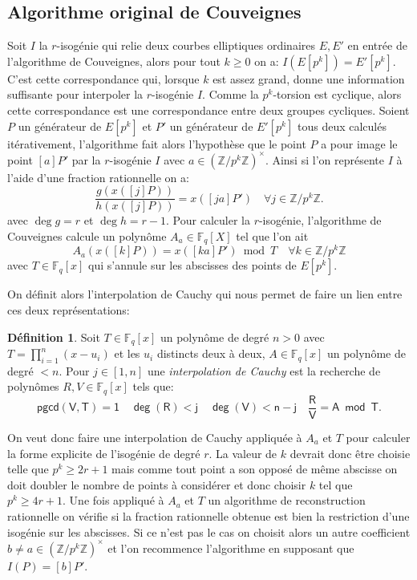 \documentclass[10pt,a4paper]{book}
\theoremstyle{plain}
\theoremstyle{definition}
\theoremstyle{definition}
\theoremstyle{definition}
\theoremstyle{definition}
\theoremstyle{definition}
\newtheorem{defi}[thm]{Définition}
\theoremstyle{remark}
\theoremstyle{remark}
\theoremstyle{definition}
\begin{document}
\subsection{Algorithme original de Couveignes}
\label{sub:ori:cou}
Soit $I$ la $r$-isogénie qui relie deux courbes elliptiques ordinaires 
$E,E'$ en entrée de l'algorithme de Couveignes, alors pour tout $k \geqslant 0$
on a: $I(E[p^k])=E'[p^k]$. C'est cette correspondance qui, lorsque $k$ est 
assez grand, donne une information suffisante pour interpoler la $r$-isogénie 
$I$. Comme la $p^k$-torsion est cyclique, alors cette correspondance est une 
correspondance entre deux groupes cycliques. Soient $P$ un générateur de 
$E[p^k]$ et $P'$ un générateur de $E'[p^k]$ tous deux calculés itérativement, 
l'algorithme fait alors l'hypothèse que le point $P$ a pour image le point 
$[a]P'$ par la $r$-isogénie $I$ avec $a \in (\mathbb{Z}/p^k\mathbb{Z})^{\times}$. Ainsi si
l'on représente $I$ à l'aide d'une fraction rationnelle on a:
\begin{equation}
\frac{g(x([j] P))}{h(x([j] P))}=x([ja] P') \quad \forall j \in \mathbb{Z}/p^{k}\mathbb{Z}.
\end{equation}
avec $\deg g = r$ et $\deg h = r-1$.
Pour calculer la $r$-isogénie, l'algorithme de Couveignes calcule un polynôme $A_a \in \mathbb{F}_q[X]$ tel que l'on ait 
\begin{equation}
A_a(x([k] P))= x([ka] P') \bmod T \quad \forall k \in \mathbb{Z}/p^{k}\mathbb{Z}
\end{equation} 
avec $T \in \mathbb{F}_q[x]$ qui s'annule sur les abscisses des points de 
$E[p^k]$.

On définit alors l'interpolation de Cauchy qui nous permet de faire un 
lien entre ces deux représentations:
\begin{defi}
Soit $T \in \mathbb{F}_q[x]$ un polynôme de degré $n>0$ avec 
$T=\prod_{i=1}^n(x-u_i)$ et les $u_i$ distincts deux à deux, 
$A \in \mathbb{F}_q[x]$ un polynôme de degré $<n$. Pour $j \in [1,n]$ une 
\emph{interpolation de Cauchy} est la recherche de polynômes $R,V \in \mathbb{F}_q[x]$
tels que:
\[
\mathsf{pgcd(V,T)=1 \quad \deg(R)<j \quad \deg(V)<n-j \quad \frac{R}{V}=A\bmod T}.
\]
\end{defi}
On veut donc faire une interpolation de Cauchy appliquée à $A_a$ et $T$ pour 
calculer la forme explicite de l'isogénie de degré $r$. La valeur de $k$ 
devrait donc être choisie telle que $p^k \geqslant 2 r +1$ mais comme tout 
point a son opposé de même abscisse on doit doubler le
nombre de points à considérer et donc choisir $k$ tel que 
$p^k \geqslant 4 r+1$. Une fois appliqué à $A_a$ et $T$ un algorithme de 
reconstruction rationnelle on vérifie si la fraction rationnelle obtenue est 
bien la restriction d'une isogénie sur les abscisses. Si ce n'est pas le cas on
choisit alors un autre coefficient $b \neq a \in 
\left( \mathbb{Z}/p^k \mathbb{Z} \right)^{\times}$ et l'on 
recommence l'algorithme en supposant que $I(P)=[b] P'$.
\end{document}
